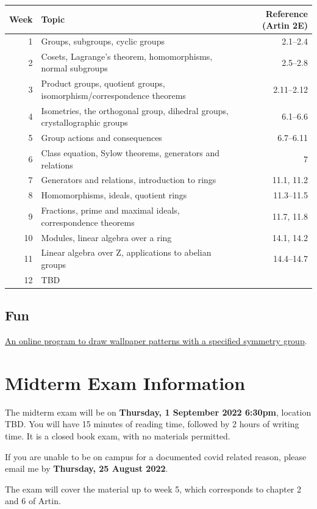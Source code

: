 \documentclass[11pt]{article}
\begin{document}
\begin{center}
\begin{tabular}{rlr}
Week & Topic & Reference (Artin 2E)\\
\hline
1 & Groups, subgroups, cyclic groups & 2.1--2.4\\
2 & Cosets, Lagrange's theorem, homomorphisms, normal subgroups & 2.5--2.8\\
3 & Product groups, quotient groups, isomorphism/correspondence theorems & 2.11--2.12\\
4 & Isometries, the orthogonal group, dihedral groups, crystallographic groups & 6.1--6.6\\
5 & Group actions and consequences & 6.7--6.11\\
6 & Class equation, Sylow theorems, generators and relations & 7\\
7 & Generators and relations, introduction to rings & 11.1, 11.2\\
8 & Homomorphisms, ideals, quotient rings & 11.3--11.5\\
9 & Fractions, prime and maximal ideals, correspondence theorems & 11.7, 11.8\\
10 & Modules, linear algebra over a ring & 14.1, 14.2\\
11 & Linear algebra over Z, applications to abelian groups & 14.4--14.7\\
12 & TBD & \\
\end{tabular}
\end{center}

\subsection{Fun}
\label{sec:orgf271f3f}
\href{https://eschersket.ch/}{An online program to draw wallpaper patterns with a specified symmetry group}.

\section{Midterm Exam Information}
\label{sec:orge513438}
The midterm exam will be on \textbf{Thursday, 1 September 2022 6:30pm}, location TBD.
You will have 15 minutes of reading time, followed by 2 hours of writing time.
It is a closed book exam, with no materials permitted.

If you are unable to be on campus for a documented covid related reason, please email me by \textbf{Thursday, 25 August 2022}.

The exam will cover the material up to week 5, which corresponds to chapter 2 and 6 of Artin.
\end{document}
